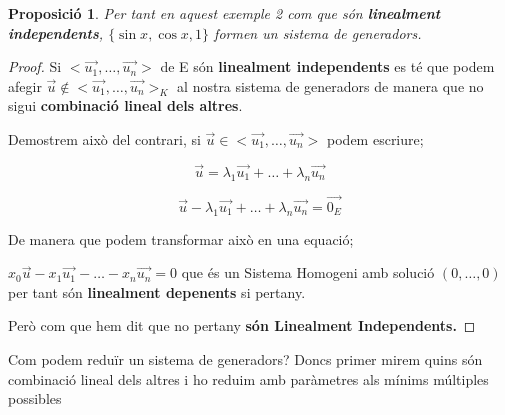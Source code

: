 \documentclass[12pt]{article}
\newtheorem{proposicio}{Proposició}[section]
\begin{document}
\begin{proposicio}
    Per tant en aquest exemple 2 com que són \textbf{linealment independents}, $\{\sin x, \cos x, 1\}$ formen un \textit{sistema de generadors}.
\end{proposicio}

\begin{proof}
    Si $<\vec{u_1}, \dots, \vec{u_n}>$ de E són \textbf{linealment independents} es té que podem afegir $\vec{u} \notin <\vec{u_1}, \dots, \vec{u_n}>_K$ al nostra sistema de generadors de manera que no sigui \textbf{combinació lineal dels altres}.

    Demostrem això del contrari, si \textit{$\vec{u} \in <\vec{u_1}, \dots, \vec{u_n}>$} podem escriure;

    \[\vec{u} = \lambda_1\vec{u_1} + \dots + \lambda_n \vec{u_n}\]

    \[\vec{u} - \lambda_1\vec{u_1} + \dots + \lambda_n \vec{u_n} = \vec{0_E}\]

    De manera que podem transformar això en una equació;

    $x_0 \vec{u} -x_1 \vec{u_1} - \dots- x_n \vec{u_n} = 0$ que és un Sistema Homogeni amb solució $(0,\dots,0)$ per tant són \textbf{linealment depenents} si pertany.

    Però com que hem dit que no pertany \textbf{són Linealment Independents.}
\end{proof}

Com podem reduïr un sistema de generadors? Doncs primer mirem quins són combinació lineal dels altres i ho reduim amb paràmetres als mínims múltiples possibles
\end{document}
